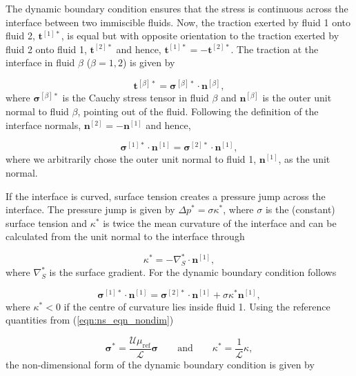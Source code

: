 \documentclass[aip,graphicx]{revtex4-1}
\newcommand{\sym}[1]{\text{#1}}
\newcommand{\vect}[1]{\bm{#1}}
\begin{document}
The dynamic boundary condition ensures that the stress is continuous across the interface between two immiscible fluids. 
Now, the traction exerted by fluid 1 onto fluid 2, $\vect{t}^{[1]*}$, is equal but with opposite orientation to the traction exerted by fluid 2 onto fluid 1, $\vect{t}^{[2]*}$ and hence, $\vect{t}^{[1]*} = - \vect{t}^{[2]*}$. 
The traction at the interface in fluid $\beta$ ($\beta=1,2$) is given by

\begin{equation}
 \vect{t}^{[\beta]*} = \vect{\sigma}^{[\beta]*} \cdot \vect{n}^{[\beta]},
\end{equation}
where $\vect{\sigma}^{[\beta]*}$ is the Cauchy stress tensor in fluid $\beta$ and $\vect{n}^{[\beta]}$ is the outer unit normal to fluid $\beta$, pointing out of the fluid. 
Following the definition of the interface normals, $\vect{n}^{[2]} = - \vect{n}^{[1]}$ and hence,

\begin{equation}
 \vect{\sigma}^{[1]*} \cdot \vect{n}^{[1]} = \vect{\sigma}^{[2]*} \cdot \vect{n}^{[1]},
\end{equation}
where we arbitrarily chose the outer unit normal to fluid 1, $\vect{n}^{[1]}$, as the unit normal.


If the interface is curved, surface tension creates a pressure jump across the interface. 
The pressure jump is given by $\Delta p^* = \sigma \kappa^*$, where $\sigma$ is the (constant) surface tension and $\kappa^*$ is twice the mean curvature of the interface and can be calculated from the unit normal to the interface through

\begin{equation}
 \kappa^* = - \nabla_S^* \cdot \vect{n}^{[1]},
\end{equation}
where $\nabla_S^*$ is the surface gradient. 
For the dynamic boundary condition follows

\begin{equation}
 \vect{\sigma}^{[1]*} \cdot \vect{n}^{[1]} = \vect{\sigma}^{[2]*} \cdot \vect{n}^{[1]} + \sigma \kappa^* \vect{n}^{[1]},
\end{equation}
where $\kappa^* < 0$ if the centre of curvature lies inside fluid 1.
Using the reference quantities from (\ref{eqn:ns_eqn_nondim})

\begin{equation}
 \vect{\sigma}^*= \frac{\mathcal{U} \mu_{\sym{ref}}}{\mathcal{L}} \vect{\sigma} \qquad \text{and} \qquad \kappa^*= \frac{1}{\mathcal{L}} \kappa,
\end{equation}
the non-dimensional form of the dynamic boundary condition is given by
\end{document}
